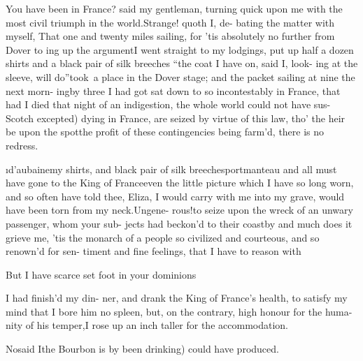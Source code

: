 \documentclass[twoside]{article}
\begin{document}
\tsk You have been in France? said 
my gentleman, turning quick upon 
me with the most civil triumph in 
the world.\tsk Strange! quoth I, de-
bating the matter with myself, That 
one and twenty miles sailing, for ’tis 
absolutely no further from Dover to 
ing up the argument\tsk I went straight
to my lodgings, put up half a dozen
shirts and a black pair of silk breeches
\tsk “the coat I have on, said I, look-
ing at the sleeve, will do”\tsk took~a 
place in the Dover stage; and the
packet sailing at nine the next morn-
ing\tsk by three I had got sat down to 
so incontestably in France, that had 
I died that night of an indigestion, 
the whole world could not have sus-
\vfill %
\bgroup\fontsize{9}{12}\selectfont\noindent
{}
Scotch excepted) dying in France, are seized 
by virtue of this law, tho’ the heir be upon 
the spot\tsh the profit of these contingencies 
being farm’d, there is no redress.\par\egroup
{}
\i{d’aubaine}\tsk my shirts, and black pair 
of silk breeches\tsk portmanteau and 
all must have gone to the King of 
France\tsk even the little picture which 
I have so long worn, and so often 
have told thee, Eliza, I would carry 
with me into my grave, would have 
been torn from my neck.\tsk Ungene-
rous!\tsk to seize upon the wreck of an 
unwary passenger, whom your sub-
jects had beckon’d to their coast\tsk by 
and much does it grieve me, ’tis the 
monarch of a people so civilized and 
courteous, and so renown’d for sen-
timent and fine feelings, that I have 
to reason with\tsh

But I have scarce set foot in your\break
dominions\tsh



 I had finish’d my din-
ner, and drank the King 
of France’s health, to satisfy my mind 
that I bore him no spleen, but, on the
contrary, high honour for the huma-
nity of his temper,\tsk I rose up an inch
taller for the accommodation.

\tsk No\tsk said I\tsk the Bourbon is by\break
{}
been drinking) could have produced.
\end{document}
